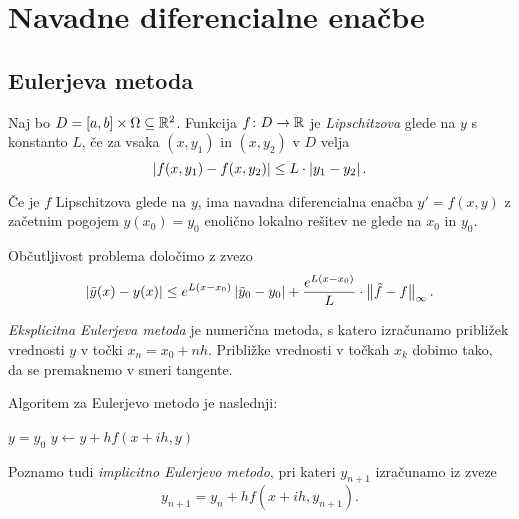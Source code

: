 \section{Navadne diferencialne enačbe}

\subsection{Eulerjeva metoda}

\begin{definicija}
Naj bo $D = [a, b] \times \Omega \subseteq \mathbb{R}^2$. Funkcija
$f \colon D \to \mathbb{R}$ je
\emph{Lipschitzova} glede na $y$ s
konstanto $L$, če za vsaka $(x, y_1)$ in $(x, y_2)$ v $D$ velja
\[
\left\lvert f(x, y_1) - f(x, y_2)\right\rvert \leq L \cdot \left\lvert y_1 - y_2\right\rvert.
\]
\end{definicija}

\begin{opomba}
Če je $f$ Lipschitzova glede na $y$, ima navadna diferencialna
enačba $y' = f(x,y)$ z začetnim pogojem $y(x_0) = y_0$ enolično
lokalno rešitev ne glede na $x_0$ in $y_0$.
\end{opomba}

\begin{opomba}
Občutljivost problema določimo z zvezo
\[
\left\lvert \tilde{y}(x) - y(x)\right\rvert \leq
e^{L(x - x_0)} \left\lvert \tilde{y}_0 - y_0\right\rvert +
\frac{e^{L(x - x_0)}}{L} \cdot \left\lVert \tilde{f} - f\right\rVert_\infty.
\]
\end{opomba}

\begin{definicija}
\emph{Eksplicitna Eulerjeva metoda}
je numerična metoda, s katero izračunamo približek vrednosti $y$ v
točki $x_n = x_0 + n h$. Približke vrednosti v točkah $x_k$ dobimo
tako, da se premaknemo v smeri tangente.
\end{definicija}

\begin{opomba}
Algoritem za Eulerjevo metodo je naslednji:

\begin{algorithmic}[1]
\State $y = y_0$
  \State $y \gets y + h f(x + ih, y)$
\EndFor
\end{algorithmic}
\end{opomba}

\begin{opomba}
Poznamo tudi \emph{implicitno Eulerjevo metodo}, pri kateri
$y_{n+1}$ izračunamo iz zveze
\[
y_{n+1} = y_n + h f(x + ih, y_{n+1}).
\]
\end{opomba}

